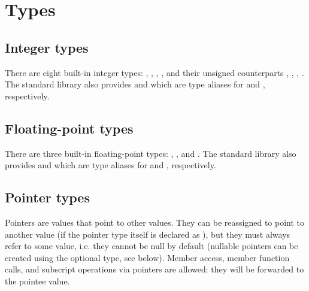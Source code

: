 
\chapter{Types}

\section{Integer types}

There are eight built-in integer types: , , ,
, and their unsigned counterparts , ,
, . The standard library also provides  and
 which are type aliases for  and ,
respectively.

\section{Floating-point types}

There are three built-in floating-point types: , ,
and . The standard library also provides  and
 which are type aliases for  and ,
respectively.

\section{Pointer types}

Pointers are values that point to other values. They can be reassigned to point
to another value (if the pointer type itself is declared as ), but
they must always refer to some value, i.e. they cannot be null by default
(nullable pointers can be created using the optional type, see below). Member
access, member function calls, and subscript operations via pointers are
allowed: they will be forwarded to the pointee value.

\begin{grammar}
 \textrightarrow{}  \code{*}\\
 \textrightarrow{}   \code{*}\\
 \textrightarrow{}   \code{*}\\
 \textrightarrow{}    \code{*}
\end{grammar}

